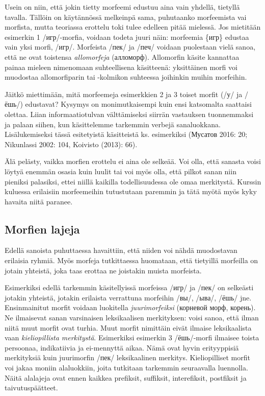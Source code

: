 \documentclass[]{scrreprt}
\begin{document}
Usein on niin, että jokin tietty morfeemi edustuu aina vain yhdellä,
tietyllä tavalla. Tällöin on käytännössä melkeinpä sama, puhutaanko
morfeemista vai morfista, mutta teoriassa erottelu toki tulee edelleen
pitää mielessä. Jos mietitään esimerkin 1 /игр/-morfia, voidaan todeta
juuri näin: morfeemia \{игр\} edustaa vain yksi morfi, /игр/. Morfeista
/пек/ ja /печ/ voidaan puolestaan vielä sanoa, että ne ovat toistensa
\emph{allomorfeja} (алломорф). Allomorfin käsite kannattaa painaa
mieleen nimenomaan suhteellisena käsitteenä: yksittäinen morfi voi
muodostaa allomorfiparin tai -kolmikon suhteessa joihinkin muihin
morfeihin.

Jäitkö miettimään, mitä morfeemeja esimerkkien 2 ja 3 toiset morfit (/у/
ja /ёшь/) edustavat? Kysymys on monimutkaisempi kuin ensi katsomalta
saattaisi olettaa. Liian informaatiotulvan välttämiseksi siirrän
vastauksen tuonnemmaksi ja palaan siihen, kun käsittelemme tarkemmin
verbejä sanaluokkana. Lisälukemiseksi tässä esitetyistä käsitteistä ks.
esimerkiksi (Мусатов 2016: 20; Nikunlassi 2002: 104, Koivisto (2013):
66).

Älä pelästy, vaikka morfien erottelu ei aina ole selkeää. Voi olla, että
sanasta voisi löytyä enemmän osasia kuin luulit tai voi myös olla, että
pilkot sanan niin pieniksi palasiksi, ettei niillä kaikilla
todellisuudessa ole omaa merkitystä. Kurssin kuluessa erilaisiin
morfeemeihin tutustutaan paremmin ja tätä myötä myös kyky havaita niitä
paranee.

\subsection{Morfien lajeja}\label{morfien-lajeja}

Edellä sanoista puhuttaessa havaittiin, että niiden voi nähdä
muodostavan erilaisia ryhmiä. Myös morfeja tutkittaessa huomataan, että
tietyillä morfeilla on jotain yhteistä, joka taas erottaa ne joistakin
muista morfeista.

Esimerkiksi edellä tarkemmin käsitellyissä morfeissa /игр/ ja /пек/ on
selkeästi jotakin yhteistä, jotakin erilaista verrattuna morfeihin /вы/,
/ыва/, /ёшь/ jne. Ensinmainitut morfit voidaan luokitella
\emph{juurimorfeiksi} (корневой морф, корень). Ne ilmaisevat sanan
varsinaisen leksikaalisen merkityksen: voisi sanoa, että ilman niitä
muut morfit ovat turhia. Muut morfit nimittäin eivät ilmaise
leksikaalista vaan \emph{kieliopillista merkitystä}. Esimerkiksi
esimerkin 3 /ёшь/-morfi ilmaisee toista persoonaa, indikatiivia ja
ei-mennyttä aikaa. Nämä ovat hyvin erityyppisiä merkityksiä kuin
juurimorfin /пек/ leksikaalinen merkitys. Kieliopilliset morfit voi
jakaa moniin alaluokkiin, joita tutkitaan tarkemmin seuraavalla
luennolla. Näitä alalajeja ovat ennen kaikkea prefiksit, suffiksit,
interefiksit, postfiksit ja taivutuspäätteet.
\end{document}
